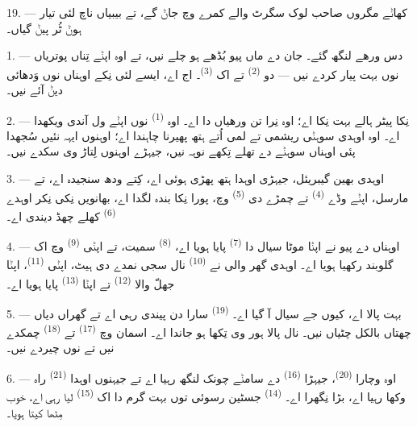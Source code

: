 19. --- کھاݨے مگروں صاحب لوک سگرٹ والے کمرے وچ جاݨ گے، تے بیبیاں ناچ لئی تیار
ہوݨ ٹُر پیݨ گیاں۔

\VUsaut{5.0mm}
\VUsaut{1.6mm}
\VUsaut{2.6mm}

\VUsaut{3.0mm}

1. --- دس ورھے لنگھ گئے۔ جان دے ماں پیو بُڈھے ہو چلے نیں، تے اوہ اپݨے تِناں
پوتریاں نوں بہت پیار کردے نیں — دو  \textsuperscript{(2)} تے اک
 \textsuperscript{(3)}۔ اج  اے، ایسے لئی
نِکے اوہناں نوں وَدھائی دیݨ آئے نیں۔

2. --- نِکا پیٹر ہالے بہت نِکا اے؛ اوہ نِرا تن ورھیاں دا اے۔ اوہ 
\textsuperscript{(1)} نوں اپݨے ول آندی ویکھدا اے۔ اوہ اوہدی سوہݨی ریشمی
 تے لمی  اُتے ہتھ پھیرنا چاہندا اے؛ اوہنوں ایہہ نئیں
سُجھدا پئی اوہناں سوہݨے  دے تھلے تِکھے نوہہ نیں، جیہڑے اوہنوں
لِتاڑ وی سکدے نیں۔

3. --- اوہدی بھین گیبریئل، جیہڑی اوہدا ہتھ پھڑی ہوئی اے، کِتے ودھ سنجیدہ اے، تے
مارسل، اپݨے وڈے  \textsuperscript{(4)} تے چمڑے دی 
\textsuperscript{(5)} وچ، پورا نِکا بندہ لگدا اے، بھانویں نِکی نِکر اوہدے
 \textsuperscript{(6)} کھلے چھڈ دیندی اے۔

4. --- اوہناں دے پیو نے اپݨا موٹا سیال دا  \textsuperscript{(7)}
پایا ہویا اے،  \textsuperscript{(8)} سمیت، تے اپݨی
 \textsuperscript{(9)} وچ اک گلوبند رکھیا ہویا اے۔ اوہدی گھر والی نے
 \textsuperscript{(10)} نال سجی نمدے دی ہیٹ، اپݨی 
\textsuperscript{(11)}، اپݨا جھلّ والا  \textsuperscript{(12)} تے
اپݨا  \textsuperscript{(13)} پایا ہویا اے۔

5. --- بہت پالا اے، کیوں جے سیال آ گیا اے۔  \textsuperscript{(19)}
سارا دن پیندی رہی اے تے گھراں دیاں چھتاں بالکل چٹیاں نیں۔  نال پالا
ہور وی تِکھا ہو جاندا اے۔ اسمان وچ  \textsuperscript{(17)} تے
 \textsuperscript{(18)} چمکدے نیں تے  نوں چیردے نیں۔

\VUsaut{4.2mm}
\VUsaut{3.0mm}

6. --- اوہ وچارا  \textsuperscript{(20)}، جیہڑا 
\textsuperscript{(16)} دے سامݨے چونک لنگھ رہیا اے تے جیہنوں اوہدا 
\textsuperscript{(21)} راہ وکھا رہیا اے، بڑا نِگھرا اے۔ 
\textsuperscript{(14)} جسٹین رسوئی توں بہت گرم  دا اک
 \textsuperscript{(15)} لیا رہی اے، خوب مِٹھا کیتا ہویا۔

